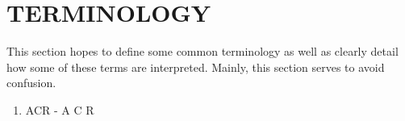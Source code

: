\documentclass[conference]{IEEEtran}
\begin{document}
\section*{TERMINOLOGY} \label{term}

This section hopes to define some common terminology as well as clearly detail
how some of these terms are interpreted. Mainly, this section serves to avoid
confusion.


\begin{enumerate}
	\item ACR - A C R
\end{enumerate}



\end{document}

